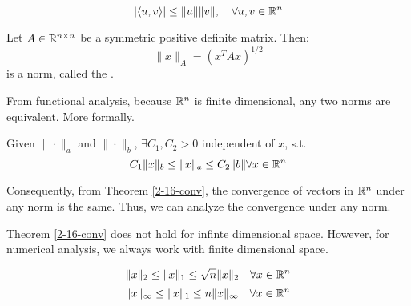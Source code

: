 \documentclass[../main/main.tex]{subfiles}
\begin{document}
\begin{theorem}
  \[
|\langle u,v\rangle| \leq \| u\| \|v\|,\quad \forall u,v \in\mathbb{R}^{n} \]
\end{theorem}
\begin{example}
  Let $A\in\mathbb{R}^{n\times n}$ be a symmetric positive definite matrix. Then: \[
\|x\|_{A} = (x^{T} A x)^{1 / 2}
  \] is a norm, called the . 
\end{example}

From functional analysis, because $\mathbb{R}^{n}$ is finite dimensional, any two norms are equivalent. More formally.
\begin{theorem}
  Given $\|\cdot\|_{a}$ and $\|\cdot\|_{b}$, $\exists C_1,C_2 >0$ independent of $x$, s.t. \[
    C_1\|x\|_{b} \leq \|x\|_{a} \leq C_2 \|b\| \forall x \in\mathbb{R}^{n}
  \]
  \label{2-16-conv}
\end{theorem}
Consequently, from Theorem \ref{2-16-conv}, the convergence of vectors in $\mathbb{R}^{n}$ under any norm is the same. Thus, we can analyze the convergence under any norm.

\begin{remark}
Theorem \ref{2-16-conv} does not hold for infinte dimensional space. However, for numerical analysis, we always work with finite dimensional space.
\end{remark}
\begin{example}
  \[
    \|x\|_{2}\leq \|x\|_{1} \leq \sqrt{n} \|x\|_{2} \quad \forall x\in\mathbb{R}^{n}
  \] \[
    \|x\|_{\infty}\leq \|x\|_{1} \leq n \|x\|_{\infty} \quad \forall x\in\mathbb{R}^{n}
  \]
\end{example}
\end{document}
